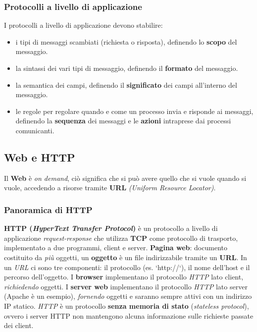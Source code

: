 \subsubsection{Protocolli a livello di applicazione}
I protocolli a livello di applicazione devono stabilire:
\begin{itemize}
\item i tipi di messaggi scambiati (richiesta o risposta), definendo lo \textbf{scopo} del messaggio.
\item la sintassi dei vari tipi di messaggio, definendo il \textbf{formato} del messaggio.
\item la semantica dei campi, definendo il \textbf{significato} dei campi all'interno del messaggio.
\item le regole per regolare quando e come un processo invia e risponde ai messaggi, definendo la \textbf{sequenza} dei messaggi e le \textbf{azioni} intraprese dai processi comunicanti.
\end{itemize}

\subsection{Web e HTTP}
Il \textbf{Web} è \textit{on demand}, ciò significa che si può avere quello che si vuole quando si vuole, accedendo a risorse tramite \textbf{URL} \textit{(Uniform Resource Locator)}.

\subsubsection{Panoramica di HTTP}
\textbf{HTTP (\textit{HyperText Transfer Protocol})} è un protocollo a livello di applicazione \textit{request-response} che utilizza \textbf{TCP} come protocollo di trasporto, implementato a due programmi, client e server.
\textbf{Pagina web}: documento costituito da \textit{più} oggetti, un \textbf{oggetto} è un file indirizzabile tramite un \textbf{URL}.
In un \textit{URL} ci sono tre componenti: il protocollo (es. `http://`), il nome dell'host e il percorso dell'oggetto.
I \textbf{browser} implementano il protocollo \textit{HTTP} lato client, \textit{richiedendo} oggetti.
I \textbf{server web} implementano il protocollo \textit{HTTP} lato server (Apache è un esempio), \textit{fornendo} oggetti e saranno sempre attivi con un indirizzo IP statico.
\textit{HTTP} è un protocollo \textbf{senza memoria di stato} (\textit{stateless protocol}), ovvero i server HTTP non mantengono alcuna informazione sulle richieste passate dei client.

